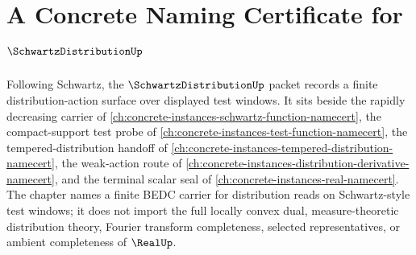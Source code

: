 \chapter{A Concrete Naming Certificate for $\SchwartzDistributionUp$}
\label{ch:concrete-instances-schwartzdistribution-namecert}

Following Schwartz, the $\SchwartzDistributionUp$ packet records a finite distribution-action surface over displayed test windows. It sits beside the rapidly decreasing carrier of \autoref{ch:concrete-instances-schwartz-function-namecert}, the compact-support test probe of \autoref{ch:concrete-instances-test-function-namecert}, the tempered-distribution handoff of \autoref{ch:concrete-instances-tempered-distribution-namecert}, the weak-action route of \autoref{ch:concrete-instances-distribution-derivative-namecert}, and the terminal scalar seal of \autoref{ch:concrete-instances-real-namecert}. The chapter names a finite BEDC carrier for distribution reads on Schwartz-style test windows; it does not import the full locally convex dual, measure-theoretic distribution theory, Fourier transform completeness, selected representatives, or ambient completeness of $\RealUp$.

